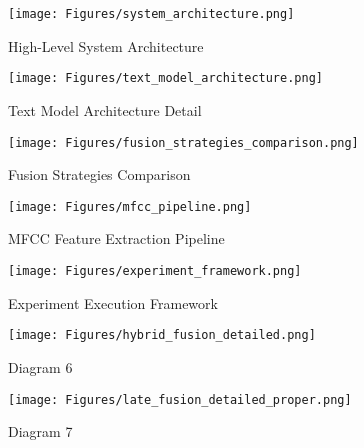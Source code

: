 
\begin{figure}[h]
    \centering
    \texttt{[image: Figures/system\_architecture.png]}
    \caption{High-Level System Architecture}
    \label{fig:system_architecture}
\end{figure}

\begin{figure}[h]
    \centering
    \texttt{[image: Figures/text\_model\_architecture.png]}
    \caption{Text Model Architecture Detail}
    \label{fig:text_model_architecture}
\end{figure}

\begin{figure}[h]
    \centering
    \texttt{[image: Figures/fusion\_strategies\_comparison.png]}
    \caption{Fusion Strategies Comparison}
    \label{fig:fusion_strategies_comparison}
\end{figure}

\begin{figure}[h]
    \centering
    \texttt{[image: Figures/mfcc\_pipeline.png]}
    \caption{MFCC Feature Extraction Pipeline}
    \label{fig:mfcc_pipeline}
\end{figure}

\begin{figure}[h]
    \centering
    \texttt{[image: Figures/experiment\_framework.png]}
    \caption{Experiment Execution Framework}
    \label{fig:experiment_framework}
\end{figure}

\begin{figure}[h]
    \centering
    \texttt{[image: Figures/hybrid\_fusion\_detailed.png]}
    \caption{Diagram 6}
    \label{fig:hybrid_fusion_detailed}
\end{figure}

\begin{figure}[h]
    \centering
    \texttt{[image: Figures/late\_fusion\_detailed\_proper.png]}
    \caption{Diagram 7}
    \label{fig:late_fusion_detailed_proper}
\end{figure}

